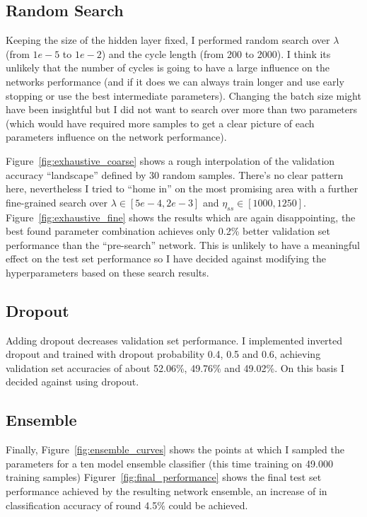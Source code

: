 \documentclass{article}
\begin{document}
\subsection{Random Search}

Keeping the size of the hidden layer fixed, I performed random search over
$\lambda$ (from $1e-5$ to $1e-2$) and the cycle length (from 200 to 2000).  I
think its unlikely that the number of cycles is going to have a large influence
on the networks performance (and if it does we can always train longer and use
early stopping or use the best intermediate parameters). Changing the batch
size might have been insightful but I did not want to search over more than two
parameters (which would have required more samples to get a clear picture of
each parameters influence on the network performance).

Figure~\ref{fig:exhaustive_coarse} shows a rough interpolation of the
validation accuracy ``landscape'' defined by 30 random samples. There's no
clear pattern here, nevertheless I tried to ``home in'' on the most promising
area with a further fine-grained search over $\lambda \in [5e-4, 2e-3]$ and
$\eta_{ss} \in [1000, 1250]$. Figure~\ref{fig:exhaustive_fine} shows the
results which are again disappointing, the best found parameter combination
achieves only 0.2\% better validation set performance than the ``pre-search''
network. This is unlikely to have a meaningful effect on the test set
performance so I have decided against modifying the hyperparameters based on
these search results.

\subsection{Dropout}

Adding dropout decreases validation set performance. I implemented inverted
dropout and trained with dropout probability 0.4, 0.5 and 0.6, achieving
validation set accuracies of about 52.06\%, 49.76\% and 49.02\%. On this basis
I decided against using dropout.

\subsection{Ensemble}

Finally, Figure~\ref{fig:ensemble_curves} shows the points at which I sampled
the parameters for a ten model ensemble classifier (this time training on
49.000 training samples) Figurer~\ref{fig:final_performance} shows the final
test set performance achieved by the resulting network ensemble, an increase of
in classification accuracy of round 4.5\% could be achieved.
\end{document}
